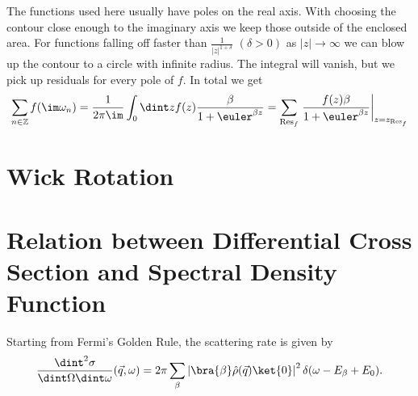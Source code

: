 \documentclass[a4paper,10pt]{report}
\begin{document}
The functions used here usually have poles on the real axis. 
With choosing the contour close enough to the imaginary axis we keep those outside of the enclosed area.
For functions falling off faster than $\frac{1}{|z|^{1+\delta}}$ $(\delta>0)$ as $|z|\rightarrow \infty$ we can blow up the contour to a
circle with infinite radius. The integral will vanish, but we pick up residuals for every pole of $f$.
In total we get
\begin{equation}
 \sum_{n\in\mathbb{Z}} f(\im \omega_n) = \frac{1}{2\pi \im} \int_0 \dint z f(z)\frac{\beta}{1+\euler^{\beta z }} 
 = \sum_{\mathrm{Res}_f} \left. \frac{f(z)\beta}{1+\euler^{\beta z }}\right|_{z=z_{\mathrm{Res}_f}}
\end{equation}

\section{Wick Rotation}

\section{Relation between Differential Cross Section and Spectral Density Function}


Starting from Fermi's Golden Rule, the scattering rate is given by 
\begin{equation} \label{FGR}
 \frac{\dint^2 \sigma}{\dint \Omega \dint \omega}(\vec q, \omega) = 2\pi \sum_{\beta} \left| \bra{\beta} \hat \rho(\vec q) \ket{0}\right|^2 \delta(\omega - E_{\beta}+E_0).
\end{equation}



\end{document}
